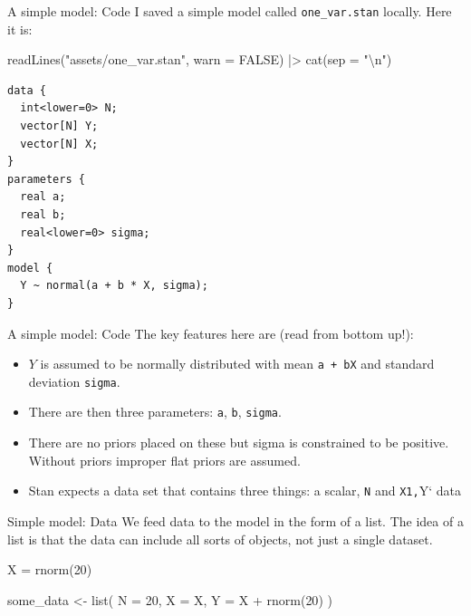 \documentclass[
  11pt,
  ignorenonframetext,
]{beamer}
\newenvironment{Shaded}{\begin{snugshade}}{\end{snugshade}}
\newcommand{\AttributeTok}[1]{\textcolor[rgb]{0.40,0.45,0.13}{#1}}
\newcommand{\ConstantTok}[1]{\textcolor[rgb]{0.56,0.35,0.01}{#1}}
\newcommand{\DecValTok}[1]{\textcolor[rgb]{0.68,0.00,0.00}{#1}}
\newcommand{\FunctionTok}[1]{\textcolor[rgb]{0.28,0.35,0.67}{#1}}
\newcommand{\NormalTok}[1]{\textcolor[rgb]{0.00,0.23,0.31}{#1}}
\newcommand{\OtherTok}[1]{\textcolor[rgb]{0.00,0.23,0.31}{#1}}
\newcommand{\SpecialCharTok}[1]{\textcolor[rgb]{0.37,0.37,0.37}{#1}}
\newcommand{\StringTok}[1]{\textcolor[rgb]{0.13,0.47,0.30}{#1}}
\providecommand{\tightlist}{%
  \setlength{\itemsep}{0pt}\setlength{\parskip}{0pt}}\usepackage{longtable,booktabs,array}
\begin{document}
\begin{frame}[fragile]{A simple model: Code}
\protect\hypertarget{a-simple-model-code-1}{}
I saved a simple model called \texttt{one\_var.stan} locally. Here it
is:

\begin{Shaded}
\begin{Highlighting}[]
\FunctionTok{readLines}\NormalTok{(}\StringTok{"assets/one\_var.stan"}\NormalTok{, }\AttributeTok{warn =} \ConstantTok{FALSE}\NormalTok{) }\SpecialCharTok{|\textgreater{}}
  \FunctionTok{cat}\NormalTok{(}\AttributeTok{sep =} \StringTok{"}\SpecialCharTok{\textbackslash{}n}\StringTok{"}\NormalTok{)}
\end{Highlighting}
\end{Shaded}

\begin{verbatim}
data {
  int<lower=0> N;
  vector[N] Y;
  vector[N] X;
}
parameters {
  real a;
  real b;
  real<lower=0> sigma;
}
model {
  Y ~ normal(a + b * X, sigma);
}
\end{verbatim}
\end{frame}

\begin{frame}[fragile]{A simple model: Code}
\protect\hypertarget{a-simple-model-code-2}{}
The key features here are (read from bottom up!):

\begin{itemize}
\tightlist
\item
  \(Y\) is assumed to be normally distributed with mean
  \texttt{a\ +\ bX} and standard deviation \texttt{sigma}.
\item
  There are then three parameters: \texttt{a}, \texttt{b},
  \texttt{sigma}.
\item
  There are no priors placed on these but sigma is constrained to be
  positive. Without priors improper flat priors are assumed.
\item
  Stan expects a data set that contains three things: a scalar,
  \texttt{N} and \texttt{X1,}Y` data
\end{itemize}
\end{frame}

\begin{frame}[fragile]{Simple model: Data}
\protect\hypertarget{simple-model-data}{}
We feed data to the model in the form of a list. The idea of a list is
that the data can include all sorts of objects, not just a single
dataset.

\begin{Shaded}
\begin{Highlighting}[]
\NormalTok{X }\OtherTok{=} \FunctionTok{rnorm}\NormalTok{(}\DecValTok{20}\NormalTok{)}

\NormalTok{some\_data }\OtherTok{\textless{}{-}} \FunctionTok{list}\NormalTok{(}
 \AttributeTok{N =} \DecValTok{20}\NormalTok{,}
 \AttributeTok{X =}\NormalTok{ X,}
 \AttributeTok{Y =}\NormalTok{ X }\SpecialCharTok{+} \FunctionTok{rnorm}\NormalTok{(}\DecValTok{20}\NormalTok{)}
\NormalTok{ )}
\end{Highlighting}
\end{Shaded}
\end{frame}
\end{document}
